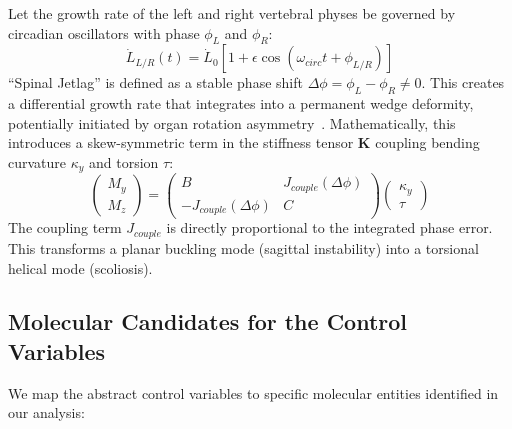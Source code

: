 Let the growth rate of the left and right vertebral physes be governed by circadian oscillators with phase $\phi_L$ and $\phi_R$:
\begin{equation}
\dot{L}_{L/R}(t) = \dot{L}_0 [ 1 + \epsilon \cos(\omega_{circ} t + \phi_{L/R}) ]
\end{equation}
``Spinal Jetlag'' is defined as a stable phase shift $\Delta \phi = \phi_L - \phi_R \neq 0$. This creates a differential growth rate that integrates into a permanent wedge deformity, potentially initiated by organ rotation asymmetry~\cite{kouwenhoven2006organ}.
Mathematically, this introduces a skew-symmetric term in the stiffness tensor $\mathbf{K}$ coupling bending curvature $\kappa_y$ and torsion $\tau$:
\begin{equation}
\begin{pmatrix} M_y \\ M_z \end{pmatrix} = \begin{pmatrix} B & J_{couple}(\Delta \phi) \\ -J_{couple}(\Delta \phi) & C \end{pmatrix} \begin{pmatrix} \kappa_y \\ \tau \end{pmatrix}
\end{equation}
The coupling term $J_{couple}$ is directly proportional to the integrated phase error. This transforms a planar buckling mode (sagittal instability) into a torsional helical mode (scoliosis).

\subsection{Molecular Candidates for the Control Variables}

We map the abstract control variables to specific molecular entities identified in our analysis:

